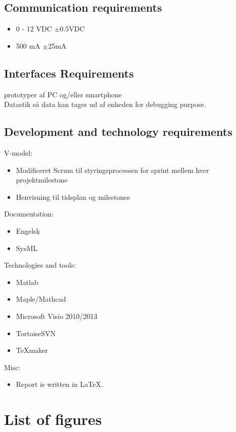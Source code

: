 \subsection{Communication requirements}
\begin{itemize}
\item 0 - 12 VDC $\pm$0.5VDC
\item 500 mA $\pm$25mA
\end{itemize}

\subsection{Interfaces Requirements}
prototyper af PC og/eller smartphone\\
Datastik så data kan tages ud af enheden for debugging purpose.\\

\subsection{Development and technology requirements }
V-model:\\
\begin{itemize}
\item Modificeret Scrum til styringsprocessen for sprint mellem hver projektmilestone
\item Henvisning til tidsplan og milestones
\end{itemize}

Documentation:\\
\begin{itemize}
\item Engelsk
\item SysML
\end{itemize}

Technologies and tools:\\
\begin{itemize}
\item Matlab
\item Maple/Mathcad
\item Microsoft Visio 2010/2013
\item TortoiseSVN
\item TeXmaker
\end{itemize}

Misc:\\
\begin{itemize}
\item Report is written in LaTeX.
\end{itemize}
\section{List of figures}